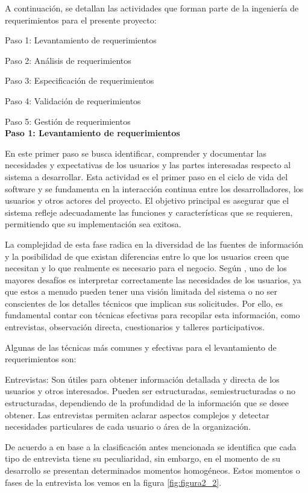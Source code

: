 		A continuación, se detallan las actividades que forman parte de la ingeniería de requerimientos para el presente proyecto:
		
		Paso 1: Levantamiento de requerimientos
		
		Paso 2: Análisis de requerimientos
		
		Paso 3: Especificación de requerimientos
		
		Paso 4: Validación de requerimientos
		
		Paso 5: Gestión de requerimientos\\
		\textbf{Paso 1: Levantamiento de requerimientos}
		
		En este primer paso se busca identificar, comprender y documentar las necesidades y expectativas de los usuarios y las partes interesadas respecto al sistema a desarrollar. Esta actividad es el primer paso en el ciclo de vida del software y se fundamenta en la interacción continua entre los desarrolladores, los usuarios y otros actores del proyecto. El objetivo principal es asegurar que el sistema refleje adecuadamente las funciones y características que se requieren, permitiendo que su implementación sea exitosa.
		
		La complejidad de esta fase radica en la diversidad de las fuentes de información y la posibilidad de que existan diferencias entre lo que los usuarios creen que necesitan y lo que realmente es necesario para el negocio. Según \textcite{sommerville2011introduccion}, uno de los mayores desafíos es interpretar correctamente las necesidades de los usuarios, ya que estos a menudo pueden tener una visión limitada del sistema o no ser conscientes de los detalles técnicos que implican sus solicitudes. Por ello, es fundamental contar con técnicas efectivas para recopilar esta información, como entrevistas, observación directa, cuestionarios y talleres participativos.
		
		Algunas de las técnicas más comunes y efectivas para el levantamiento de requerimientos son:
		
		Entrevistas: Son útiles para obtener información detallada y directa de los usuarios y otros interesados. Pueden ser estructuradas, semiestructuradas o no estructuradas, dependiendo de la profundidad de la información que se desee obtener. Las entrevistas permiten aclarar aspectos complejos y detectar necesidades particulares de cada usuario o área de la organización.
		
		De acuerdo a \textcite{diaz2013entrevista} en base a la clasificación antes mencionada se identifica que cada tipo de entrevista tiene su peculiaridad, sin embargo, en el momento de su desarrollo se presentan determinados momentos homogéneos. Estos momentos o fases de
		la entrevista los vemos en la figura \ref{fig:figura2_2}.
		

